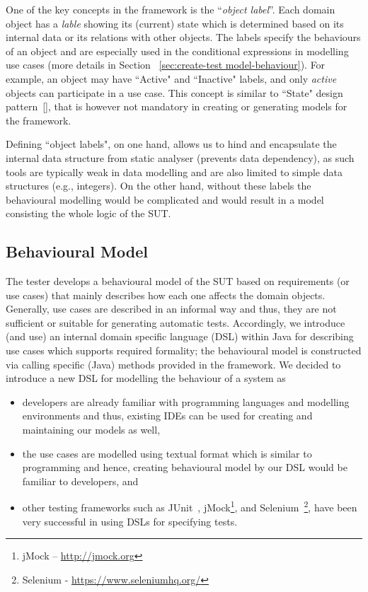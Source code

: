 One of the key concepts in the framework is the ``\textit{object label}''. Each domain object has a \textit{lable} showing its (current) state which is determined based on its internal data or its relations with other objects. The labels specify the behaviours of an object and are especially used in the conditional expressions in modelling use cases (more details in Section ~\ref{sec:create-test model-behaviour}). For example, an object may have ``Active" and ``Inactive" labels, and only \textit{active} objects can participate in a use case. This concept is similar to ``State" design pattern~[], that is however not mandatory in creating or generating models for the framework. 

Defining ``object labels", on one hand, allows us to hind and encapsulate the internal data structure from static analyser (prevents data dependency), as such tools are typically weak in data modelling and are also limited to simple data structures (e.g., integers). On the other hand, without these labels the behavioural modelling would be complicated and would result in a model consisting the whole logic of the SUT.

\subsection{Behavioural Model}
\label{sec:framework-overview-behaviour}
The tester develops a behavioural model of the SUT based on requirements (or use cases) that mainly describes how each one affects the domain objects. Generally, use cases are described in an informal way and thus, they are not sufficient or suitable for generating automatic tests. Accordingly, we introduce (and use) an internal domain specific language (DSL) within Java for describing use cases which supports required formality; the behavioural model is constructed via calling specific (Java) methods provided in the framework. 
We decided to introduce a new DSL for modelling the behaviour of a system as 
\begin{itemize}
	\item developers are already familiar with programming languages and modelling environments and thus, existing IDEs can be used for creating and maintaining our models as well,
	
	\item the use cases are modelled using textual format which is similar to programming and hence, creating behavioural model by our DSL would be familiar to developers, and 
	
	\item other testing frameworks such as JUnit~\cite{Beck2000}, jMock\footnote{ jMock – \url{http://jmock.org}}, and Selenium~\footnote{Selenium - \url{https://www.seleniumhq.org/}}, have been very successful in using DSLs for specifying tests.
\end{itemize}


